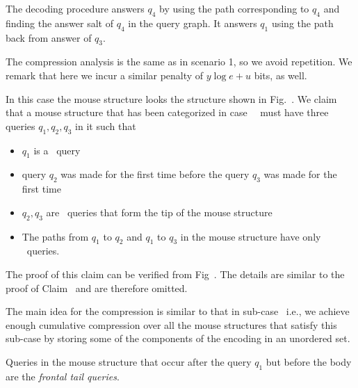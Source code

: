 {The decoding procedure answers $q_4$ by using the path corresponding to $q_4$ and finding the answer salt of $q_4$ in the query graph. It answers $q_1$ using the path back from answer of $q_3$.


The compression analysis is the same as in scenario 1, so we avoid repetition. We remark that here we incur a similar penalty of $y\log e+ u$ bits, as well.




In this case the mouse structure looks the structure shown in Fig.~. We claim that a mouse structure that has been categorized in case~~ must have three queries $q_1,q_2,q_3$ in it such that
\begin{itemize}
\item $q_1$ is a \new\ query
\item query $q_2$ was made for the first time before the query $q_3$ was made for the first time
\item $q_2,q_3$ are \urep\ queries that form the tip of the mouse structure
\item The paths from $q_1$ to $q_2$ and $q_1$ to $q_3$ in the mouse structure have only \urep\ queries.
\end{itemize}
The proof of this claim can be verified from Fig~. The details are similar to the proof of Claim~ and are therefore omitted.

The main idea for the compression is similar to that in sub-case~ i.e., we achieve enough cumulative compression over all the mouse structures that satisfy this sub-case by storing some of the components of the encoding in an unordered set. 

\begin{definition} Queries in the mouse structure that occur after the query $q_1$ but before the body are the \emph{frontal tail queries}.
\end{definition}

}
